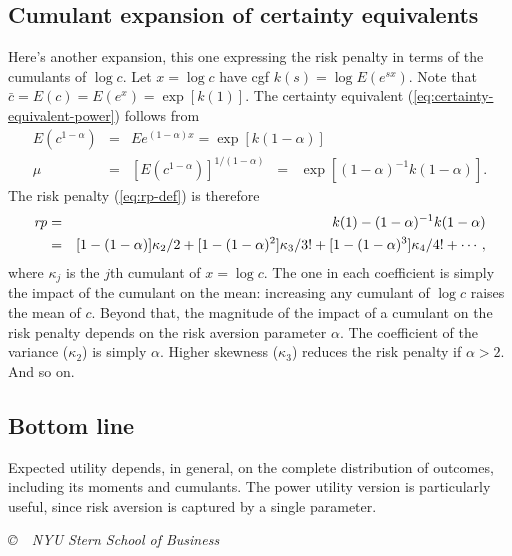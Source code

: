 \documentclass[11pt]{article}
\newcommand{\rp}{\mbox{\it rp\/}}
\newcommand{\cbar}{\bar{c}}
\begin{document}
\subsection*{Cumulant expansion of certainty equivalents}

Here's another expansion,
this one expressing the risk penalty in terms of the
cumulants of $\log c$.
Let $ x = \log c$ have cgf $k(s) = \log E (e^{sx}) $.
Note that $\cbar = E(c) = E (e^x) = \exp[k(1)]$.
The certainty equivalent (\ref{eq:certainty-equivalent-power})
follows from
\begin{eqnarray*}
    E (c^{1-\alpha}) &=& E e^{(1-\alpha) x} = \exp[k(1-\alpha)] \\
    \mu  &=& [E (c^{1-\alpha})]^{1/(1-\alpha)}
                \;\;=\;\; \exp[(1-\alpha)^{-1} k(1-\alpha)] .
\end{eqnarray*}
The risk penalty (\ref{eq:rp-def}) is therefore
\begin{eqnarray*}
    \rp &=& k(1) - (1-\alpha)^{-1} k(1-\alpha) \\
        &=& [1-(1-\alpha)] \kappa_2/2 + [1- (1-\alpha)^2] \kappa_3/3!
            + [1- (1-\alpha)^3] \kappa_4/4! + \cdots ,
\end{eqnarray*}
where $\kappa_j$ is the $j$th cumulant of $x = \log c$.
The one in each coefficient is simply the impact of the cumulant on the mean:
increasing any cumulant of $\log c$ raises the mean of $c$.
Beyond that, the magnitude of the impact of a cumulant
on the risk penalty depends on the risk aversion
parameter $\alpha$.
The coefficient of the variance ($\kappa_2$) is simply $\alpha$.
Higher skewness ($\kappa_3$) reduces the risk penalty if $\alpha > 2$.
And so on.


\subsection*{Bottom line}

Expected utility depends, in general,
on the complete distribution of outcomes,
including its moments and cumulants.
The power utility version is particularly useful,
since risk aversion is captured by a single parameter.


\vfill \centerline{\it \copyright \ \number\year \
NYU Stern School of Business}
\end{document}
